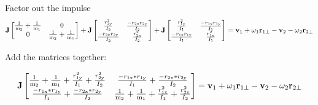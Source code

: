 \documentclass[12pt]{article}
\begin{document}
\noindent
Factor out the impulse
\begin{equation*}
\textbf J\begin{bmatrix}
\frac{1}{ \textnormal m_\text{2}} + \frac{1}{ \textnormal m_\text{1}} & 0\\0 
& \frac{1}{ \textnormal m_\text{2}} + \frac{1}{ \textnormal m_\text{1}}\\       
 \end{bmatrix} + \textbf J
 \begin{bmatrix}
\frac{ r_\text{2y}^{2}}{I_\text{2}} &
\frac{-r_\text{2x}r_\text{2y}}{I_\text{2}}\\
\frac{-r_\text{2x}r_\text{2y}}{I_\text{2}} &
\frac{r_\text{2x}^{2}}{I_\text{2}}\\
        \end{bmatrix} + \textbf J
 \begin{bmatrix}
\frac{ r_\text{1y}^{2}}{I_\text{1}} &
\frac{-r_\text{1x}r_\text{1y}}{I_\text{1}}\\
\frac{-r_\text{1x}r_\text{1y}}{I_\text{1}} &
\frac{r_\text{1x}^{2}}{I_\text{1}}\\
        \end{bmatrix} 
= \textbf v_\text{1} + \omega_\text{1} \textbf r_\text{1$\perp$} - \textbf
v_\text{2} - \omega_\text{2}\textbf r_\text{2$\perp$}
\end{equation*}

\noindent
Add the matrices together:

\begin{equation*}
\textbf J
\begin{bmatrix}
\frac{1}{ \textnormal m_\text{2}} + \frac{1}{ \textnormal m_\text{1}}+
\frac{r_\text{1y}^{2}}{I_\text{1}} + \frac{r_\text{2y}^{2}}{I_\text{2}} &
\frac{-r_\text{1x} * r_\text{1y}}{I_\text{1}} + \frac{-r_\text{2x} *
r_\text{2y}}{I_\text{2}}\\
\frac{-r_\text{1x} * r_\text{1y}}{I_\text{1}} + \frac{-r_\text{2x} *
r_\text{2y}}{I_\text{2}} &
\frac{1}{ \textnormal m_\text{2}} + \frac{1}{ \textnormal m_\text{1}}+
\frac{r_\text{1x}^{2}}{I_\text{1}} + \frac{r_\text{2x}^{2}}{I_\text{2}}\\
        \end{bmatrix}
= \textbf v_\text{1} + \omega_\text{1} \textbf r_\text{1$\perp$} - \textbf
v_\text{2} - \omega_\text{2}\textbf r_\text{2$\perp$}
\end{equation*}
\end{document}
